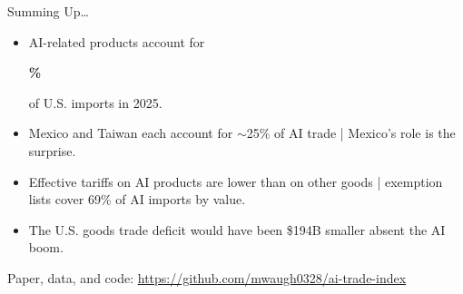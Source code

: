 \documentclass[11pt,pdftex,aspectratio=1610]{beamer}
\def\cfNetAiEffect{194}
\begin{document}

\begin{frame}[t]{Summing Up\ldots}
\smallskip
\begin{itemize}
\item AI-related products account for \begin{alert}{\textbf{\aiShareTwentyFive{}\%}}\end{alert} of U.S. imports in 2025.
\bigskip
\item Mexico and Taiwan each account for $\sim$25\% of AI trade | Mexico's role is the surprise.
\bigskip
\item Effective tariffs on AI products are lower than on other goods | exemption lists cover 69\% of AI imports by value.
\bigskip
\item The U.S. goods trade deficit would have been \$\cfNetAiEffect{}B smaller absent the AI boom.
\end{itemize}
\bigskip
\bigskip
Paper, data, and code: \url{https://github.com/mwaugh0328/ai-trade-index}
\end{frame}

\end{document}
